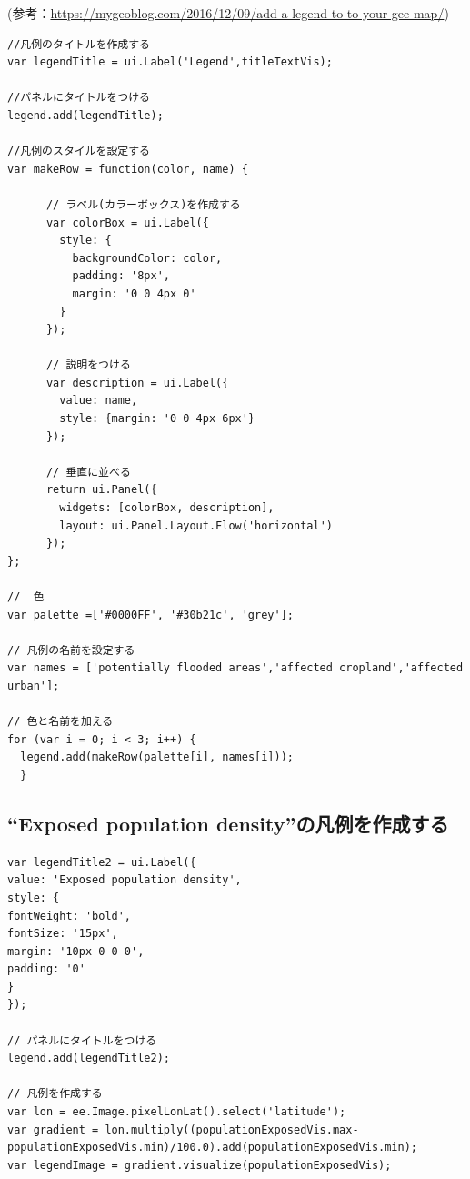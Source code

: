\documentclass[
]{book}
\begin{document}
(参考：\url{https://mygeoblog.com/2016/12/09/add-a-legend-to-to-your-gee-map/})

\begin{verbatim}
//凡例のタイトルを作成する
var legendTitle = ui.Label('Legend',titleTextVis);

//パネルにタイトルをつける
legend.add(legendTitle);

//凡例のスタイルを設定する
var makeRow = function(color, name) {
 
      // ラベル(カラーボックス)を作成する
      var colorBox = ui.Label({
        style: {
          backgroundColor: color,
          padding: '8px',
          margin: '0 0 4px 0'
        }
      });
 
      // 説明をつける
      var description = ui.Label({
        value: name,
        style: {margin: '0 0 4px 6px'}
      });
 
      // 垂直に並べる
      return ui.Panel({
        widgets: [colorBox, description],
        layout: ui.Panel.Layout.Flow('horizontal')
      });
};

//  色
var palette =['#0000FF', '#30b21c', 'grey'];
 
// 凡例の名前を設定する
var names = ['potentially flooded areas','affected cropland','affected urban'];
 
// 色と名前を加える
for (var i = 0; i < 3; i++) {
  legend.add(makeRow(palette[i], names[i]));
  }  
\end{verbatim}

\hypertarget{exposed-population-densityux306eux51e1ux4f8bux3092ux4f5cux6210ux3059ux308b}{%
\subsection{``Exposed population density''の凡例を作成する}\label{exposed-population-densityux306eux51e1ux4f8bux3092ux4f5cux6210ux3059ux308b}}

\begin{verbatim}
var legendTitle2 = ui.Label({
value: 'Exposed population density',
style: {
fontWeight: 'bold',
fontSize: '15px',
margin: '10px 0 0 0',
padding: '0'
}
});

// パネルにタイトルをつける
legend.add(legendTitle2);

// 凡例を作成する
var lon = ee.Image.pixelLonLat().select('latitude');
var gradient = lon.multiply((populationExposedVis.max-populationExposedVis.min)/100.0).add(populationExposedVis.min);
var legendImage = gradient.visualize(populationExposedVis);
\end{verbatim}
\end{document}
